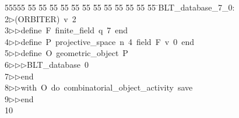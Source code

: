 %
%
\begin{tabbing}
55555 \= 55 \= 55 \= 55 \= 55 \= 55 \= 55 \= 55 \= 55 \= 55 \= 55 \= 55 \= 55 \= \>BLT\_database\_7\_0:\\[0pt]
2\>$\triangleright$\>(ORBITER)\ v\ 2\ \\[0pt]
3\>$\triangleright$\>$\triangleright$\>define\ F\ finite\_field\ q\ 7\ end\ \\[0pt]
4\>$\triangleright$\>$\triangleright$\>define\ P\ projective\_space\ n\ 4\ field\ F\ v\ 0\ end\ \\[0pt]
5\>$\triangleright$\>$\triangleright$\>define\ O\ geometric\_object\ P\ \\[0pt]
6\>$\triangleright$\>$\triangleright$\>$\triangleright$\>BLT\_database\ 0\ \\[0pt]
7\>$\triangleright$\>$\triangleright$\>end\ \\[0pt]
8\>$\triangleright$\>$\triangleright$\>with\ O\ do\ combinatorial\_object\_activity\ save\ \\[0pt]
9\>$\triangleright$\>$\triangleright$\>end\\[0pt]
10\>\end{tabbing}
